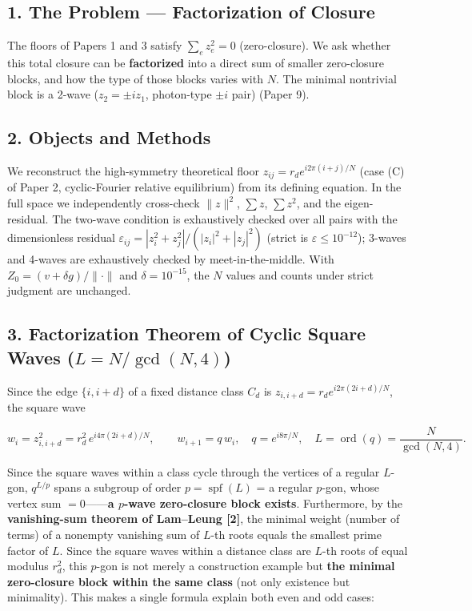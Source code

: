 \documentclass[
  a4paper,
]{ltjsarticle}
\newcounter{none} %
\begin{document}
\subsection{1. The Problem --- Factorization of
Closure}\label{the-problem-factorization-of-closure}

The floors of Papers 1 and 3 satisfy \(\sum_e z_e^2=0\) (zero-closure).
We ask whether this total closure can be \textbf{factorized} into a
direct sum of smaller zero-closure blocks, and how the type of those
blocks varies with \(N\). The minimal nontrivial block is a 2-wave
(\(z_2=\pm i z_1\), photon-type \(\pm i\) pair) (Paper 9).

\subsection{2. Objects and Methods}\label{objects-and-methods}

We reconstruct the high-symmetry theoretical floor
\(z_{ij}=r_d e^{i2\pi(i+j)/N}\) (case (C) of Paper 2, cyclic-Fourier
relative equilibrium) from its defining equation. In the full space we
independently cross-check \(\|z\|^2\), \(\sum z\), \(\sum z^2\), and the
eigen-residual. The two-wave condition is exhaustively checked over all
pairs with the dimensionless residual
\(\varepsilon_{ij}=|z_i^2+z_j^2|/(|z_i|^2+|z_j|^2)\) (strict is
\(\varepsilon\le10^{-12}\)); 3-waves and 4-waves are exhaustively
checked by meet-in-the-middle. With \(Z_0=(v+\delta g)/\|\cdot\|\) and
\(\delta=10^{-15}\), the \(N\) values and counts under strict judgment
are unchanged.

\subsection{\texorpdfstring{3. Factorization Theorem of Cyclic Square
Waves
(\(L=N/\gcd(N,4)\))}{3. Factorization Theorem of Cyclic Square Waves (L=N/\textbackslash gcd(N,4))}}\label{factorization-theorem-of-cyclic-square-waves-lngcdn4}

Since the edge \(\{i,i+d\}\) of a fixed distance class \(C_d\) is
\(z_{i,i+d}=r_d e^{i2\pi(2i+d)/N}\), the square wave

\[w_i=z_{i,i+d}^2=r_d^2\,e^{i4\pi(2i+d)/N},\qquad w_{i+1}=q\,w_i,\quad q=e^{i8\pi/N},\quad L=\operatorname{ord}(q)=\frac{N}{\gcd(N,4)}.\]

Since the square waves within a class cycle through the vertices of a
regular \(L\)-gon, \(q^{L/p}\) spans a subgroup of order
\(p=\operatorname{spf}(L)\) = a regular \(p\)-gon, whose vertex sum
\(=0\)------\textbf{a \(p\)-wave zero-closure block exists}.
Furthermore, by the \textbf{vanishing-sum theorem of Lam--Leung
{[}2{]}}, the minimal weight (number of terms) of a nonempty vanishing
sum of \(L\)-th roots equals the smallest prime factor of \(L\). Since
the square waves within a distance class are \(L\)-th roots of equal
modulus \(r_d^2\), this \(p\)-gon is not merely a construction example
but \textbf{the minimal zero-closure block within the same class} (not
only existence but minimality). This makes a single formula explain both
even and odd cases:
\end{document}
